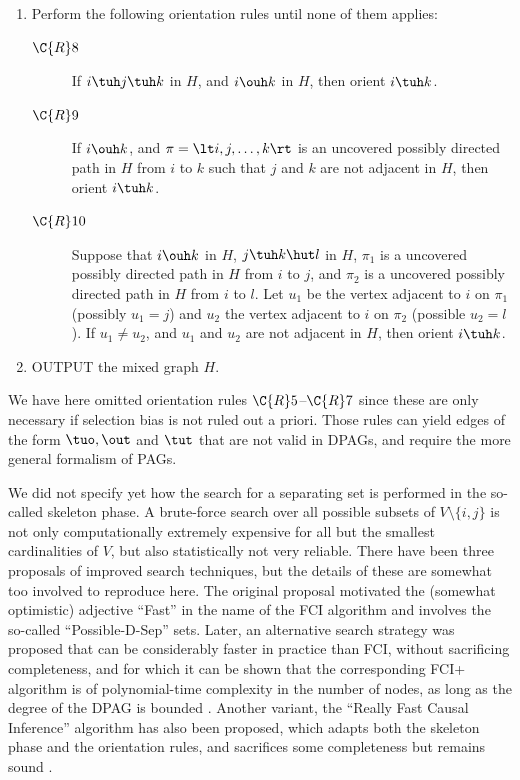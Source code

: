 \begin{enumerate}
  \item Perform the following orientation rules until none of them applies:
    \begin{description}
      \item[$\C{R}8$] If $i \tuh j \tuh k$ in $H$, and $i \ouh k$ in $H$, then orient $i \tuh k$.
      \item[$\C{R}9$] If $i \ouh k$, and $\pi = \lt i, j, \dots, k \rt$ is an uncovered possibly directed path in $H$ from $i$ to $k$ such that $j$ and $k$ are not adjacent in $H$, then orient $i \tuh k$.
      \item[$\C{R}10$] Suppose that $i \ouh k$ in $H$, $j \tuh k \hut l$ in $H$, $\pi_1$ is a uncovered possibly directed path in $H$ from $i$ to $j$, and $\pi_2$ is a uncovered possibly directed path in $H$ from $i$ to $l$. Let $u_1$ be the vertex adjacent to $i$ on $\pi_1$ (possibly $u_1 = j$) and $u_2$ the vertex adjacent to $i$ on $\pi_2$ (possible $u_2 = l$). If $u_1 \ne u_2$, and $u_1$ and $u_2$ are not adjacent in $H$, then orient $i \tuh k$.
    \end{description}
  \item OUTPUT the mixed graph $H$.
\end{enumerate}
We have here omitted orientation rules $\C{R}5$--$\C{R}7$ since these are only necessary if selection bias is not ruled out a
priori. 
Those rules can yield edges of the form $\tuo, \out$ and $\tut$ that are not valid in DPAGs, and require the more general
formalism of PAGs.

We did not specify yet how the search for a separating set is performed in the so-called skeleton phase.
A brute-force search over all possible subsets of $V\setminus \{i,j\}$ is not only computationally extremely expensive for all but the smallest cardinalities of $V$, but also statistically not very reliable.
There have been three proposals of improved search techniques, but the details of these are somewhat too involved to reproduce here.
The original proposal motivated the (somewhat optimistic) adjective ``Fast'' in the name of the FCI algorithm and involves the so-called ``Possible-D-Sep'' sets.
Later, an alternative search strategy was proposed that can be considerably faster in practice than FCI, without sacrificing completeness, and for which it can be shown that the corresponding FCI+ algorithm is of polynomial-time complexity in the number of nodes, as long as the degree of the DPAG is bounded \cite{ClaassenMooijHeskes_UAI_13}.
Another variant, the ``Really Fast Causal Inference'' algorithm has also been proposed, which adapts both the skeleton phase and the orientation rules, and sacrifices some completeness but remains sound \cite{Colombo++2012}.

